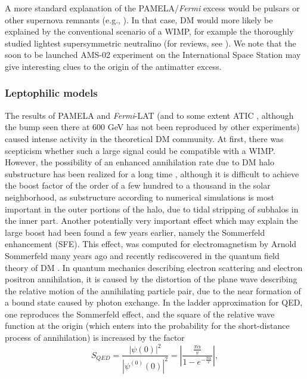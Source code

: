 \documentclass[10pt,aps,pra,reprint,amsmath,amsfonts,amssymb,showpacs,nofootinbib,floatfix]{revtex4-1}
\newcommand{\Fermi}{{\em Fermi}\xspace}
\begin{document}
A more standard explanation of the PAMELA/\Fermi excess would be
pulsars or other supernova remnants (e.g.,
\cite{1995PhRvD..52.3265A,Hooper:2008kg,Ahlers:2009ae}). In that case,
DM would more likely be explained by the conventional scenario of a WIMP,
for example the thoroughly studied lightest supersymmetric neutralino
(for reviews, see
\cite{Jungman:1995df,Bergstrom:2000pn,Bertone:2004pz}). We note that
the soon to be launched AMS-02 experiment on the International Space
Station \cite{ams02} may give interesting clues to the origin of the
antimatter excess.

\subsubsection{Leptophilic models}
\label{sect:LP}
The results of PAMELA \cite{Adriani:2008zr} and \Fermi-LAT
\cite{Abdo:2009zk} (and to some extent ATIC
\cite{2008Natur.456..362C}, although the bump seen there at 600 GeV
has not been reproduced by other experiments) caused intense
activity in the theoretical DM community. At first, there was
scepticism whether such a large signal could be compatible with a
WIMP. However, the possibility of an enhanced annihilation rate due to
DM halo substructure has been realized for a long time
\cite{1993ApJ...411..439S,Bergstrom:1998zs,Moore:1999nt}, although it
is difficult to achieve the boost factor of the order of a few hundred
to a thousand in the solar neighborhood, as substructure according to
numerical simulations is most important in the outer portions of the
halo, due to tidal stripping of subhalos in the inner part. Another
potentially very important effect which may explain the large boost
had been found a few years earlier, namely the Sommerfeld enhancement
(SFE). This effect, was computed for electromagnetism by Arnold
Sommerfeld many years ago \cite{sommerfeld} and recently rediscovered
in the quantum field theory of DM
\cite{2005PhRvD..71f3528H,2007NuPhB.787..152C,2009PhRvD..79a5014A}.
In quantum mechanics describing electron scattering and electron
positron annihilation, it is caused by the distortion of the plane
wave describing the relative motion of the annihilating particle pair,
due to the near formation of a bound state caused by photon
exchange. In the ladder approximation for QED, one reproduces the
Sommerfeld effect, and the square of the relative wave function at the
origin (which enters into the probability for the short-distance
process of annihilation) is increased by the factor
\cite{2009PhRvD..79a5014A}
\begin{equation}
S_{QED}=\frac{|\psi(0)|^2}{|\psi^{(0)}(0)|^2}=
\left|\frac{\frac{\pi\alpha}{v}}{1-e^{-\frac{\pi\alpha}{v}}}\right|,
\end{equation}
\end{document}
